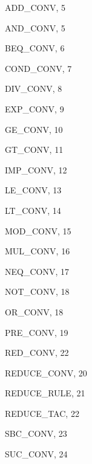 \begin{theindex}

  \item {\ptt ADD\_CONV}, 5
  \item {\ptt AND\_CONV}, 5

  \indexspace

  \item {\ptt BEQ\_CONV}, 6

  \indexspace

  \item {\ptt COND\_CONV}, 7

  \indexspace

  \item {\ptt DIV\_CONV}, 8

  \indexspace

  \item {\ptt EXP\_CONV}, 9

  \indexspace

  \item {\ptt GE\_CONV}, 10
  \item {\ptt GT\_CONV}, 11

  \indexspace

  \item {\ptt IMP\_CONV}, 12

  \indexspace

  \item {\ptt LE\_CONV}, 13
  \item {\ptt LT\_CONV}, 14

  \indexspace

  \item {\ptt MOD\_CONV}, 15
  \item {\ptt MUL\_CONV}, 16

  \indexspace

  \item {\ptt NEQ\_CONV}, 17
  \item {\ptt NOT\_CONV}, 18

  \indexspace

  \item {\ptt OR\_CONV}, 18

  \indexspace

  \item {\ptt PRE\_CONV}, 19

  \indexspace

  \item {\ptt RED\_CONV}, 22
  \item {\ptt REDUCE\_CONV}, 20
  \item {\ptt REDUCE\_RULE}, 21
  \item {\ptt REDUCE\_TAC}, 22

  \indexspace

  \item {\ptt SBC\_CONV}, 23
  \item {\ptt SUC\_CONV}, 24

\end{theindex}
